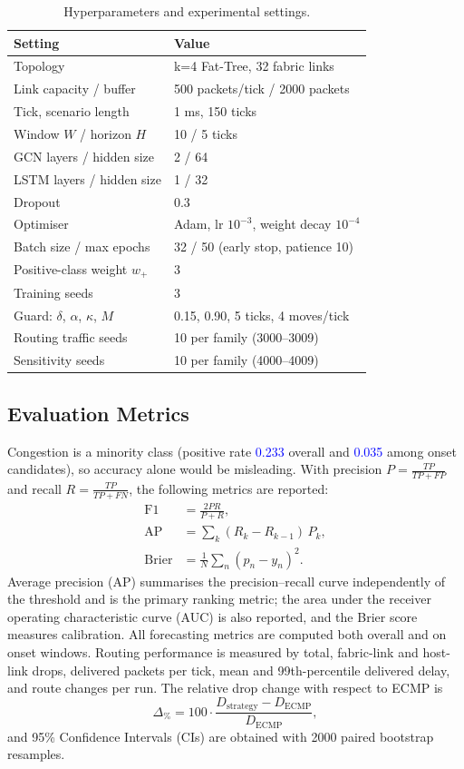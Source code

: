 \documentclass[conference]{IEEEtran}
\newcommand{\chk}[1]{\textcolor{blue}{#1}}
\begin{document}
\begin{table}[!t]
\centering
\caption{Hyperparameters and experimental settings.}
\label{tab:hyper}
\footnotesize
\begin{tabular}{ll}
\toprule
\textbf{Setting} & \textbf{Value}\\
\midrule
Topology & k=4 Fat-Tree, 32 fabric links\\
Link capacity / buffer & 500 packets/tick / 2000 packets\\
Tick, scenario length & 1 ms, 150 ticks\\
Window $W$ / horizon $H$ & 10 / 5 ticks\\
GCN layers / hidden size & 2 / 64\\
LSTM layers / hidden size & 1 / 32\\
Dropout & 0.3\\
Optimiser & Adam, lr $10^{-3}$, weight decay $10^{-4}$\\
Batch size / max epochs & 32 / 50 (early stop, patience 10)\\
Positive-class weight $w_+$ & 3\\
Training seeds & 3\\
Guard: $\delta$, $\alpha$, $\kappa$, $M$ & 0.15, 0.90, 5 ticks, 4 moves/tick\\
Routing traffic seeds & 10 per family (3000--3009)\\
Sensitivity seeds & 10 per family (4000--4009)\\
\bottomrule
\end{tabular}
\end{table}

\subsection{Evaluation Metrics}
Congestion is a minority class (positive rate \chk{0.233} overall and \chk{0.035} among onset candidates), so accuracy alone would be misleading. With precision $P=\frac{TP}{TP+FP}$ and recall $R=\frac{TP}{TP+FN}$, the following metrics are reported:
\begin{align}
\mathrm{F1}&=\frac{2PR}{P+R}, \label{eq:f1}\\
\mathrm{AP}&=\sum_{k}(R_k-R_{k-1})\,P_k, \label{eq:ap}\\
\mathrm{Brier}&=\frac{1}{N}\sum_{n}(p_n-y_n)^2. \label{eq:brier}
\end{align}
Average precision (AP) summarises the precision--recall curve independently of the threshold and is the primary ranking metric; the area under the receiver operating characteristic curve (AUC) is also reported, and the Brier score measures calibration. All forecasting metrics are computed both overall and on onset windows. Routing performance is measured by total, fabric-link and host-link drops, delivered packets per tick, mean and 99th-percentile delivered delay, and route changes per run. The relative drop change with respect to ECMP is
\begin{equation}
\Delta_{\%}=100\cdot\frac{D_{\text{strategy}}-D_{\text{ECMP}}}{D_{\text{ECMP}}},
\label{eq:delta}
\end{equation}
and 95\% Confidence Intervals (CIs) are obtained with 2000 paired bootstrap resamples.
\end{document}
